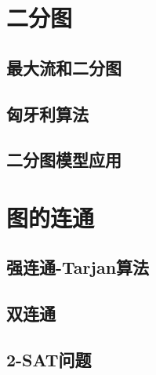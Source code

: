 \documentclass[fontset=ubuntu]{ctexbook}
\begin{document}
    \section{二分图}
    \subsection{最大流和二分图}
    \subsection{匈牙利算法}
    \subsection{二分图模型应用}
    \section{图的连通}
    \subsection{强连通-Tarjan算法}
    \subsection{双连通}
    \subsection{2-SAT问题}
\end{document}
